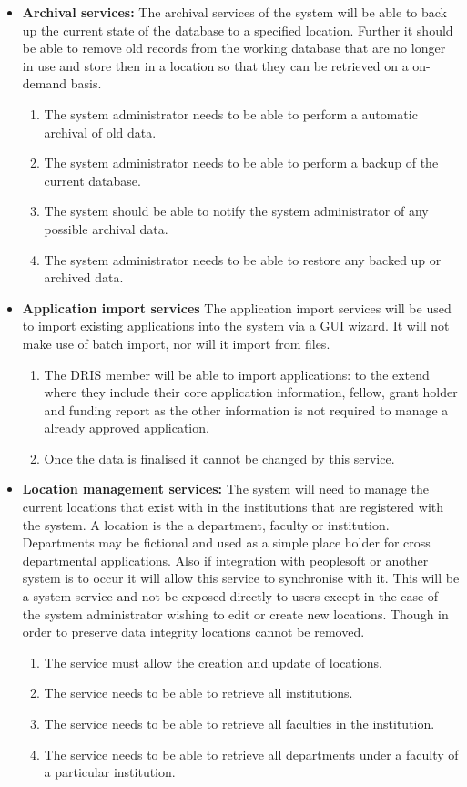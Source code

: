 \documentclass[12pt]{article}
\begin{document}
\begin{itemize}
		\item\textbf{Archival services:}
		The archival services of the system will be able to back up the current state of the database to a specified location. Further it should be able to remove old records from the working database that are no longer in use and store then in a location so that they can be retrieved on a on-demand basis.
		\begin{enumerate}		
			\item The system administrator needs to be able to perform a automatic archival of old data.
			\item The system administrator needs to be able to perform a backup of the current database.
			\item The system should be able to notify the system administrator of any possible archival data.
			\item The system administrator needs to be able to restore any backed up or archived data.
		\end{enumerate}
		
		\item\textbf{Application import services}
		The application import services will be used to import existing applications into the system via a GUI wizard. It will not make use of batch import, nor will it import from files.
		\begin{enumerate}		
			\item The DRIS member will be able to import applications: to the extend where they include their core application information, fellow, grant holder and funding report as the other information is not required to manage a already approved application.
			\item Once the data is finalised it cannot be changed by this service.
		\end{enumerate}
		
		\item\textbf{Location management services:}
		The system will need to manage the current locations that exist with in the institutions that are registered with the system. A location is the a department, faculty or institution. Departments may be fictional and used as a simple place holder for cross departmental applications. Also if integration with peoplesoft or another system is to occur it will allow this service to synchronise with it. This will be a system service and not be exposed directly to users except in the case of the system administrator wishing to edit or create new locations. Though in order to preserve data integrity locations cannot be removed.
		\begin{enumerate}		
			\item The service must allow the creation and update of locations.
			\item The service needs to be able to retrieve all institutions.
			\item The service needs to be able to retrieve all faculties in the institution.
			\item The service needs to be able to retrieve all departments under a faculty of a particular institution.
		\end{enumerate}
		

\end{itemize}
\end{document}
